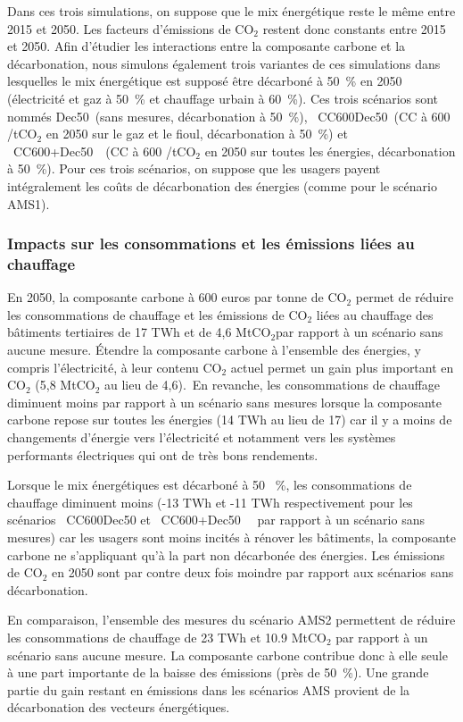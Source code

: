 \documentclass[10.5pt,a4paper]{article}
\def\euro{\mbox{\raisebox{.25ex}{{\it =}}\hspace{-.5em}{\sf C}}}
\begin{document}
{Dans ces trois simulations, on suppose que le mix énergétique reste le même entre 2015 et 2050. Les facteurs d'émissions de CO$_2$ restent donc constants entre 2015 et 2050. Afin d'étudier les interactions entre la composante carbone et la décarbonation, nous simulons également trois variantes de ces simulations dans lesquelles le mix énergétique est supposé être décarboné à 50~\% en 2050 (électricité et gaz à 50~\% et chauffage urbain à 60~\%). Ces trois scénarios sont nommés \og Dec50\fg~(sans mesures, décarbonation à 50~\%),  \og~CC600Dec50\fg~(CC à 600 \euro/tCO$_2$ en 2050 sur le gaz et le fioul, décarbonation à 50~\%) et \og~CC600+Dec50~\fg~(CC à 600 \euro/tCO$_2$ en 2050 sur toutes les énergies, décarbonation à 50~\%). Pour ces trois scénarios, on suppose que les usagers payent intégralement les coûts de décarbonation des énergies (comme pour le scénario AMS1).

\subsubsection{Impacts sur les consommations et les émissions liées au chauffage}

En 2050, la composante carbone à 600 euros par tonne de CO$_2$ permet de réduire les consommations de chauffage et les émissions de CO$_2$ liées au chauffage des bâtiments tertiaires de 17 TWh et de 4,6 MtCO$_2$par rapport à un scénario sans aucune mesure. Étendre la composante carbone à l'ensemble des énergies, y compris l’électricité, à leur contenu CO$_2$ actuel permet un gain plus important en CO$_2$  (5,8 MtCO$_2$ au lieu de 4,6). En revanche, les consommations de chauffage diminuent moins par rapport à un scénario sans mesures lorsque la composante carbone repose sur toutes les énergies (14 TWh au lieu de 17) car il y a moins de changements d'énergie vers l'électricité et notamment vers les systèmes performants électriques qui ont de très bons rendements.

Lorsque le mix énergétiques est décarboné à 50 ~\%, les consommations de chauffage diminuent moins (-13 TWh et -11 TWh respectivement pour les scénarios \og~CC600Dec50 et \og~CC600+Dec50~\fg~ par rapport à un scénario sans mesures) car les usagers sont moins incités à rénover les bâtiments, la composante carbone ne s'appliquant qu'à la part non décarbonée des énergies. Les émissions de CO$_2$ en 2050 sont par contre deux fois moindre par rapport aux scénarios sans décarbonation. 

En comparaison, l'ensemble des mesures du scénario AMS2 permettent de réduire les consommations de chauffage de 23 TWh et 10.9 MtCO$_2$ par rapport à un scénario sans aucune mesure. La composante carbone contribue donc à elle seule à une part importante de la baisse des émissions (près de 50~\%). Une grande partie du gain restant en émissions dans les scénarios AMS provient de la décarbonation des vecteurs énergétiques. 

}
\end{document}
